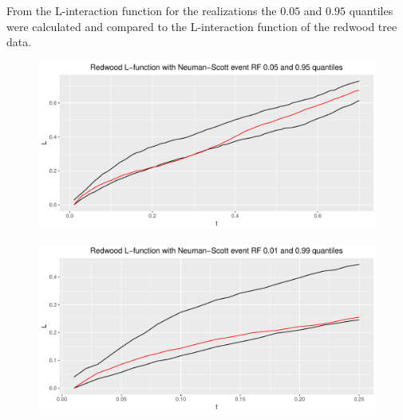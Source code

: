 From the L-interaction function for the realizations the $0.05$ and $0.95$ quantiles were calculated and compared to the L-interaction function of the redwood tree data. 

\begin{figure}
    \centering
    \includegraphics[scale=0.65]{figures/ns_quant1.pdf}
    \caption{}
    \label{fig:ns_quant1}
\end{figure}

\begin{figure}
    \centering
    \includegraphics[scale=0.65]{figures/ns_quant2.pdf}
    \caption{}
    \label{fig:ns_quant2}
\end{figure}